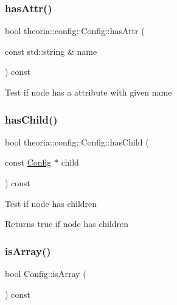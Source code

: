 \subsubsection{\texorpdfstring{has\+Attr()}{hasAttr()}}
{\footnotesize\ttfamily bool theoria\+::config\+::\+Config\+::has\+Attr (\begin{DoxyParamCaption}\item[{const std\+::string \&}]{name }\end{DoxyParamCaption}) const\hspace{0.3cm}{\ttfamily [inline]}}

Test if node has a attribute with given name \mbox{\label{classtheoria_1_1config_1_1Config_ad9a5e883dc4918b1b9d00c1a53979149}} 
\subsubsection{\texorpdfstring{has\+Child()}{hasChild()}}
{\footnotesize\ttfamily bool theoria\+::config\+::\+Config\+::has\+Child (\begin{DoxyParamCaption}\item[{const \hyperlink{classtheoria_1_1config_1_1Config}{Config} $\ast$}]{child }\end{DoxyParamCaption}) const\hspace{0.3cm}{\ttfamily [inline]}}

Test if node has children \begin{DoxyReturn}{Returns}
true if node has children 
\end{DoxyReturn}
\mbox{\label{classtheoria_1_1config_1_1Config_a1c634f42efd6c6d4463136ec24a1e7e5}} 
\subsubsection{\texorpdfstring{is\+Array()}{isArray()}}
{\footnotesize\ttfamily bool Config\+::is\+Array (\begin{DoxyParamCaption}{ }\end{DoxyParamCaption}) const\hspace{0.3cm}{\ttfamily [virtual]}}

